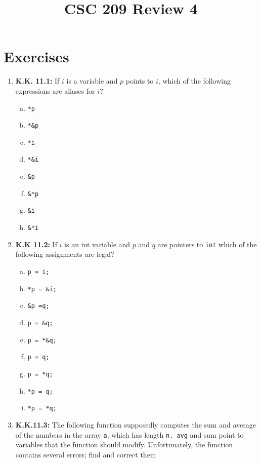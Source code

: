 \documentclass[12pt]{article}
\begin{document}
\title{CSC 209 Review 4}
\maketitle

\bigskip

\section{Exercises}

\begin{enumerate}[1.]
    \item \textbf{K.K. 11.1:} If $i$ is a variable and $p$ points to $i$,
    which of the following expressions are aliases for $i$?

    \begin{enumerate}[a)]
        \item \texttt{*p}
        \item \texttt{*\&p}
        \item \texttt{*i}
        \item \texttt{*\&i}
        \item \texttt{\&p}
        \item \texttt{\&*p}
        \item \texttt{\&i}
        \item \texttt{\&*i}
    \end{enumerate}

    \item \textbf{K.K 11.2:} If $i$ is an int variable and $p$ and $q$ are pointers to \texttt{int}
    which of the following assignments are legal?

    \begin{enumerate}[a)]
        \item \texttt{p = i;}
        \item \texttt{*p = \&i;}
        \item \texttt{\&p =q;}
        \item \texttt{p = \&q;}
        \item \texttt{p = *\&q;}
        \item \texttt{p = q;}
        \item \texttt{p = *q;}
        \item \texttt{*p = q;}
        \item \texttt{*p = *q;}
    \end{enumerate}

    \item \textbf{K.K.11.3:} The following function supposedly computes the sum and average of the
    numbers in the array \texttt{a}, which has length \texttt{n. avg} and sum point to variables
    that the function should modify. Unfortunately, the function contains several errors; find
    and correct them


\end{enumerate}
\end{document}
